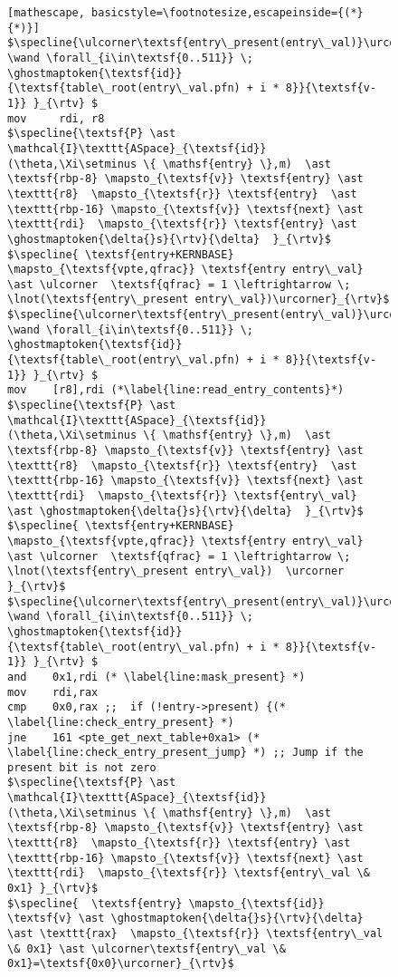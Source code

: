 \begin{figure}
\begin{lstlisting}[mathescape, basicstyle=\footnotesize,escapeinside={(*}{*)}]
$\specline{\ulcorner\textsf{entry\_present(entry\_val)}\urcorner \wand \forall_{i\in\textsf{0..511}} \; \ghostmaptoken{\textsf{id}}{\textsf{table\_root(entry\_val.pfn) + i * 8}}{\textsf{v-1}} }_{\rtv} $
mov     rdi, r8
$\specline{\textsf{P} \ast \mathcal{I}\texttt{ASpace}_{\textsf{id}}(\theta,\Xi\setminus \{ \mathsf{entry} \},m)  \ast \textsf{rbp-8} \mapsto_{\textsf{v}} \textsf{entry} \ast \texttt{r8}  \mapsto_{\textsf{r}} \textsf{entry}  \ast  \texttt{rbp-16} \mapsto_{\textsf{v}} \textsf{next} \ast \texttt{rdi}  \mapsto_{\textsf{r}} \textsf{entry} \ast \ghostmaptoken{\delta{}s}{\rtv}{\delta}  }_{\rtv}$
$\specline{ \textsf{entry+KERNBASE} \mapsto_{\textsf{vpte,qfrac}} \textsf{entry entry\_val} \ast \ulcorner  \textsf{qfrac} = 1 \leftrightarrow \; \lnot(\textsf{entry\_present entry\_val})\urcorner}_{\rtv}$
$\specline{\ulcorner\textsf{entry\_present(entry\_val)}\urcorner \wand \forall_{i\in\textsf{0..511}} \; \ghostmaptoken{\textsf{id}}{\textsf{table\_root(entry\_val.pfn) + i * 8}}{\textsf{v-1}} }_{\rtv} $
mov    [r8],rdi (*\label{line:read_entry_contents}*)
$\specline{\textsf{P} \ast \mathcal{I}\texttt{ASpace}_{\textsf{id}}(\theta,\Xi\setminus \{ \mathsf{entry} \},m)  \ast \textsf{rbp-8} \mapsto_{\textsf{v}} \textsf{entry} \ast \texttt{r8}  \mapsto_{\textsf{r}} \textsf{entry}  \ast  \texttt{rbp-16} \mapsto_{\textsf{v}} \textsf{next} \ast \texttt{rdi}  \mapsto_{\textsf{r}} \textsf{entry\_val}  \ast \ghostmaptoken{\delta{}s}{\rtv}{\delta}  }_{\rtv}$
$\specline{ \textsf{entry+KERNBASE} \mapsto_{\textsf{vpte,qfrac}} \textsf{entry entry\_val} \ast \ulcorner  \textsf{qfrac} = 1 \leftrightarrow \; \lnot(\textsf{entry\_present entry\_val})  \urcorner }_{\rtv}$
$\specline{\ulcorner\textsf{entry\_present(entry\_val)}\urcorner \wand \forall_{i\in\textsf{0..511}} \; \ghostmaptoken{\textsf{id}}{\textsf{table\_root(entry\_val.pfn) + i * 8}}{\textsf{v-1}} }_{\rtv} $
and    0x1,rdi (* \label{line:mask_present} *)
mov    rdi,rax
cmp    0x0,rax ;;  if (!entry->present) {(* \label{line:check_entry_present} *)
jne    161 <pte_get_next_table+0xa1> (* \label{line:check_entry_present_jump} *) ;; Jump if the present bit is not zero
$\specline{\textsf{P} \ast \mathcal{I}\texttt{ASpace}_{\textsf{id}}(\theta,\Xi\setminus \{ \mathsf{entry} \},m)  \ast \textsf{rbp-8} \mapsto_{\textsf{v}} \textsf{entry} \ast \texttt{r8}  \mapsto_{\textsf{r}} \textsf{entry} \ast \texttt{rbp-16} \mapsto_{\textsf{v}} \textsf{next} \ast \texttt{rdi}  \mapsto_{\textsf{r}} \textsf{entry\_val \& 0x1} }_{\rtv}$
$\specline{  \textsf{entry} \mapsto_{\textsf{id}} \textsf{v} \ast \ghostmaptoken{\delta{}s}{\rtv}{\delta}  \ast \texttt{rax}  \mapsto_{\textsf{r}} \textsf{entry\_val \& 0x1} \ast \ulcorner\textsf{entry\_val \& 0x1}=\textsf{0x0}\urcorner}_{\rtv}$

\end{lstlisting}
\end{figure}
